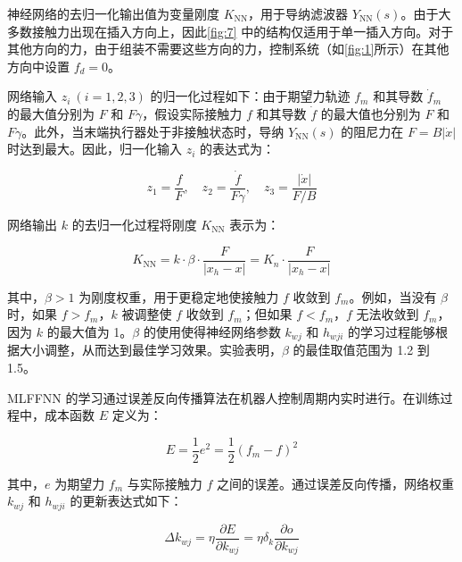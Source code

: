 \documentclass{Diploma}
\begin{document}
神经网络的去归一化输出值为变量刚度 $K_{\mathrm{NN}}$，用于导纳滤波器 $Y_{\mathrm{NN}}(s)$。由于大多数接触力出现在插入方向上，因此\ref{fig:7} 中的结构仅适用于单一插入方向。对于其他方向的力，由于组装不需要这些方向的力，控制系统（如\ref{fig:1}所示）在其他方向中设置 $f_d = 0$。

%

网络输入 $z_i \ (i = 1, 2, 3)$ 的归一化过程如下：由于期望力轨迹 $f_m$ 和其导数 $\dot{f}_m$ 的最大值分别为 $F$ 和 $F\gamma$，假设实际接触力 $f$ 和其导数 $\dot{f}$ 的最大值也分别为 $F$ 和 $F\gamma$。此外，当末端执行器处于非接触状态时，导纳 $Y_{\mathrm{NN}}(s)$ 的阻尼力在 $F = B |\dot{x}|$ 时达到最大。因此，归一化输入 $z_i$ 的表达式为：

\begin{equation} \label{eq:z_i}
z_1 = \frac{f}{F}, \quad z_2 = \frac{\dot{f}}{F\gamma}, \quad z_3 = \frac{|\dot{x}|}{F/B}
\end{equation}

网络输出 $k$ 的去归一化过程将刚度 $K_{\mathrm{NN}}$ 表示为：

\begin{equation} \label{eq:k}
K_{\mathrm{NN}} = k \cdot \beta \cdot \frac{F}{|x_h - x|} = K_n \cdot \frac{F}{|x_h - x|}
\end{equation}

其中，$\beta > 1$ 为刚度权重，用于更稳定地使接触力 $f$ 收敛到 $f_m$。例如，当没有 $\beta$ 时，如果 $f > f_m$，$k$ 被调整使 $f$ 收敛到 $f_m$；但如果 $f < f_m$，$f$ 无法收敛到 $f_m$，因为 $k$ 的最大值为 1。$\beta$ 的使用使得神经网络参数 $k_{wj}$ 和 $h_{wji}$ 的学习过程能够根据大小调整，从而达到最佳学习效果。实验表明，$\beta$ 的最佳取值范围为 1.2 到 1.5。

MLFFNN 的学习通过误差反向传播算法在机器人控制周期内实时进行。在训练过程中，成本函数 $E$ 定义为：

\begin{equation} \label{eq:E}
E = \frac{1}{2} e^2 = \frac{1}{2} (f_m - f)^2
\end{equation}

其中，$e$ 为期望力 $f_m$ 与实际接触力 $f$ 之间的误差。通过误差反向传播，网络权重 $k_{wj}$ 和 $h_{wji}$ 的更新表达式如下：

\begin{equation} \label{eq:delta_k_h}
\Delta k_{wj} = \eta \frac{\partial E}{\partial k_{wj}} = \eta \delta_k \frac{\partial o}{\partial k_{wj}}
\end{equation}
\end{document}
